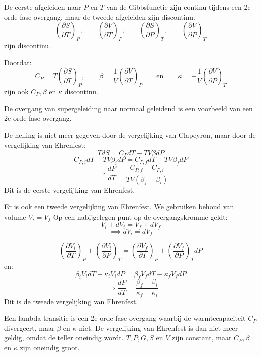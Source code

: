 De eerste afgeleiden naar \(P\) en \(T\) van de Gibbsfunctie zijn continu tijdens een 2e-orde fase-overgang, maar de tweede afgeleiden zijn discontinu.
\[\left(\frac{\partial S}{\partial T}\right)_P ,\qquad \left(\frac{\partial V}{\partial T}\right)_P, \qquad \left(\frac{\partial S}{\partial P}\right)_T, \qquad \left(\frac{\partial V}{\partial P}\right)_T \]
zijn discontinu.

Doordat:
\[C_P = T \left(\frac{\partial S}{\partial T}\right)_P, \qquad \beta = \frac{1}{V} \left(\frac{\partial V}{\partial T}\right)_P \qquad\text{en}\qquad \kappa = -\frac{1}{V} \left(\frac{\partial V}{\partial P}\right)_T \]
zijn ook \(C_P, \beta\) en \(\kappa\) discontinu.

De overgang van supergeleiding naar normaal geleidend is een voorbeeld van een 2e-orde fase-overgang.

De helling is niet meer gegeven door de vergelijking van Clapeyron, maar door de vergelijking van Ehrenfest:
\[TdS = C_P dT - TV\beta dP\]
\[C_{P,i}dT - TV\beta _{i}dP = C_{P,f}dT - TV\beta _{f}dP\]
\[\implies \frac{dP}{dT} = \frac{C_{P,f} - C_{P,i}}{TV(\beta_f - \beta_i)}\]
Dit is de eerste vergelijking van Ehrenfest.

Er is ook een tweede vergelijking van Ehrenfest.
We gebruiken behoud van volume \(V_i = V_f\)
Op een nabijgelegen punt op de overgangskromme geldt:
\[V_i + dV_i = V_f + dV_f\]
\[\implies dV_i = dV_f\]

\[\left(\frac{\partial V_i}{\partial T}\right)_P + \left(\frac{\partial V_{i}}{\partial P}\right)_T
=
\left(\frac{\partial V_f}{\partial T}\right)_P + \left(\frac{\partial V_f}{\partial P}\right)_T dP\]
en:
\[\beta_i V_i dT - \kappa_i V_i dP = \beta_f V_f dT - \kappa_f V_f dP\]
\[\implies \frac{dP}{dT} = \frac{\beta_f - \beta_i}{\kappa_f - \kappa_i}\]
Dit is de tweede vergelijking van Ehrenfest.

\begin{definition}
    Een lambda-transitie is een 2e-orde fase-overgang waarbij de warmtecapaciteit \(C_P\) divergeert, maar \(\beta\) en \(\kappa\) niet. De vergelijking van Ehrenfest is dan niet meer geldig, omdat de teller oneindig wordt.
    \(T, P, G, S \) en \(V\) zijn constant, maar \(C_P, \beta\) en \(\kappa\) zijn oneindig groot.
\end{definition}
